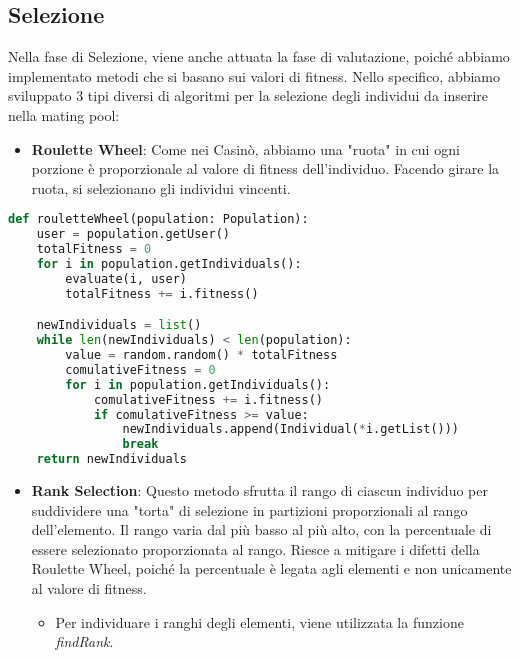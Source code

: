 \documentclass{article}
\begin{document}
\pagebreak

\subsection{Selezione}

Nella fase di Selezione, viene anche attuata la fase di valutazione, poiché abbiamo implementato metodi che si basano sui valori di fitness. Nello specifico, abbiamo sviluppato 3 tipi diversi di algoritmi per la selezione degli individui da inserire nella mating pool:

\begin{itemize}
\item\textbf{Roulette Wheel}: Come nei Casinò, abbiamo una "ruota" in cui ogni porzione è proporzionale al valore di fitness dell'individuo. Facendo girare la ruota, si selezionano gli individui vincenti.
\end{itemize}

\begin{lstlisting}[language=Python, breaklines, no caption]
def rouletteWheel(population: Population):
    user = population.getUser()
    totalFitness = 0
    for i in population.getIndividuals():
        evaluate(i, user)
        totalFitness += i.fitness()

    newIndividuals = list()
    while len(newIndividuals) < len(population):
        value = random.random() * totalFitness
        comulativeFitness = 0
        for i in population.getIndividuals():
            comulativeFitness += i.fitness()
            if comulativeFitness >= value:
                newIndividuals.append(Individual(*i.getList()))
                break
    return newIndividuals
\end{lstlisting}

\begin{itemize}
\item\textbf{Rank Selection}: Questo metodo sfrutta il rango di ciascun individuo per suddividere una "torta" di selezione in partizioni proporzionali al rango dell'elemento. Il rango varia dal più basso al più alto, con la percentuale di essere selezionato proporzionata al rango. Riesce a mitigare i difetti della Roulette Wheel, poiché la percentuale è legata agli elementi e non unicamente al valore di fitness.
\begin{itemize}
    \item Per individuare i ranghi degli elementi, viene utilizzata la funzione \textit{findRank}.
\end{itemize}

\end{itemize}
\end{document}
